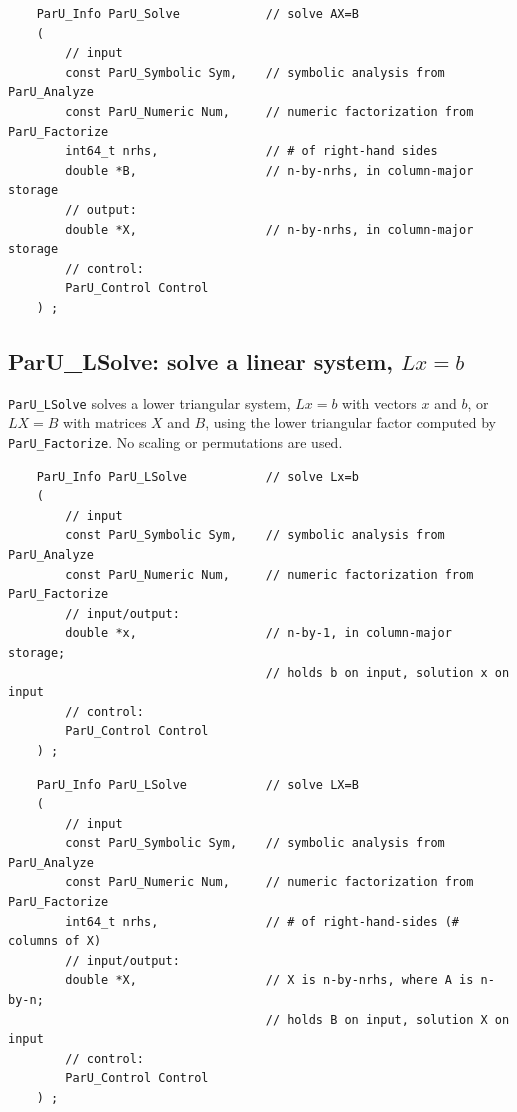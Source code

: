 \documentclass[12pt]{article}
\begin{document}
    {\footnotesize
    \begin{verbatim}
    ParU_Info ParU_Solve            // solve AX=B
    (
        // input
        const ParU_Symbolic Sym,    // symbolic analysis from ParU_Analyze
        const ParU_Numeric Num,     // numeric factorization from ParU_Factorize
        int64_t nrhs,               // # of right-hand sides
        double *B,                  // n-by-nrhs, in column-major storage
        // output:
        double *X,                  // n-by-nrhs, in column-major storage
        // control:
        ParU_Control Control
    ) ; \end{verbatim} }

\subsection{{\sf ParU\_LSolve}: solve a linear system, $Lx=b$}

    \verb'ParU_LSolve' solves a lower triangular system, $Lx=b$ with vectors
    $x$ and $b$, or $LX=B$ with matrices $X$ and $B$, using the lower
    triangular factor computed by \verb'ParU_Factorize'.  No scaling or
    permutations are used.

    {\footnotesize
    \begin{verbatim}
    ParU_Info ParU_LSolve           // solve Lx=b
    (
        // input
        const ParU_Symbolic Sym,    // symbolic analysis from ParU_Analyze
        const ParU_Numeric Num,     // numeric factorization from ParU_Factorize
        // input/output:
        double *x,                  // n-by-1, in column-major storage;
                                    // holds b on input, solution x on input
        // control:
        ParU_Control Control
    ) ; \end{verbatim} }

    {\footnotesize
    \begin{verbatim}
    ParU_Info ParU_LSolve           // solve LX=B
    (
        // input
        const ParU_Symbolic Sym,    // symbolic analysis from ParU_Analyze
        const ParU_Numeric Num,     // numeric factorization from ParU_Factorize
        int64_t nrhs,               // # of right-hand-sides (# columns of X)
        // input/output:
        double *X,                  // X is n-by-nrhs, where A is n-by-n;
                                    // holds B on input, solution X on input
        // control:
        ParU_Control Control
    ) ; \end{verbatim} }
\end{document}
